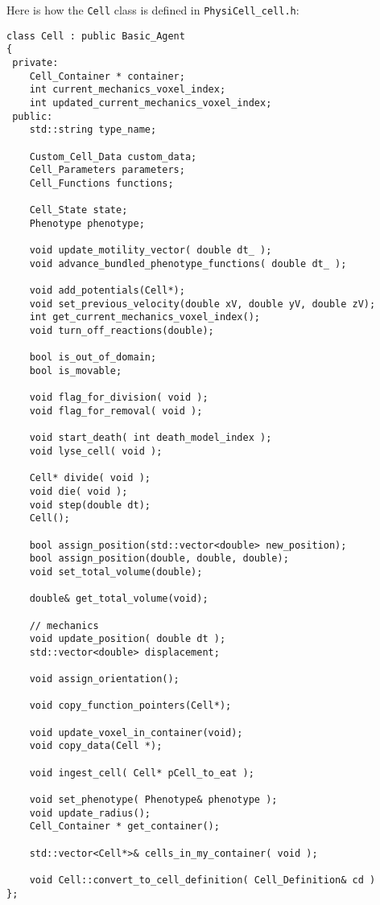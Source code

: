 \documentclass[12pt]{article}
\renewcommand{\v}{\verb}
\begin{document}
Here is how the \v|Cell| class is defined in 
\v|PhysiCell_cell.h|: 

\begin{verbatim}
class Cell : public Basic_Agent 
{
 private: 
    Cell_Container * container;
    int current_mechanics_voxel_index;
    int updated_current_mechanics_voxel_index; 
 public:
    std::string type_name; 
 
    Custom_Cell_Data custom_data;
    Cell_Parameters parameters;
    Cell_Functions functions; 
    
    Cell_State state; 
    Phenotype phenotype; 
    
    void update_motility_vector( double dt_ );
    void advance_bundled_phenotype_functions( double dt_ ); 
    
    void add_potentials(Cell*);
    void set_previous_velocity(double xV, double yV, double zV);
    int get_current_mechanics_voxel_index();
    void turn_off_reactions(double);  
    
    bool is_out_of_domain;
    bool is_movable;
    
    void flag_for_division( void );   
    void flag_for_removal( void );   
    
    void start_death( int death_model_index ); 
    void lyse_cell( void ); 

    Cell* divide( void );
    void die( void );
    void step(double dt);
    Cell();
    
    bool assign_position(std::vector<double> new_position);
    bool assign_position(double, double, double);
    void set_total_volume(double);

    double& get_total_volume(void);
    
    // mechanics 
    void update_position( double dt );  
    std::vector<double> displacement; 

    void assign_orientation();  
    
    void copy_function_pointers(Cell*);
    
    void update_voxel_in_container(void);
    void copy_data(Cell *);
	
    void ingest_cell( Cell* pCell_to_eat ); 	

    void set_phenotype( Phenotype& phenotype );  
    void update_radius();
    Cell_Container * get_container();
    
    std::vector<Cell*>& cells_in_my_container( void ); 
    
    void Cell::convert_to_cell_definition( Cell_Definition& cd )
};
\end{verbatim}
\end{document}
